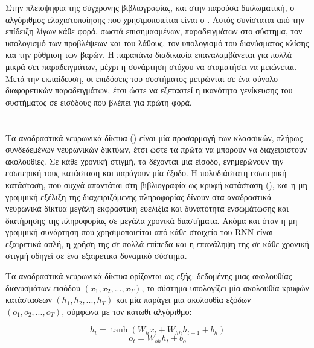 Στην πλειοψηφία της σύγχρονης βιβλιογραφίας, και στην παρούσα διπλωματική, ο αλγόριθμος ελαχιστοποίησης που χρησιμοποιείται είναι ο .
Αυτός συνίσταται από την επίδειξη λίγων κάθε φορά, σωστά επισημασμένων, παραδειγμάτων στο σύστημα, τον υπολογισμό των προβλέψεων και του λάθους, τον υπολογισμό του διανύσματος κλίσης και την ρύθμιση των βαρών.
Η παραπάνω διαδικασία επαναλαμβάνεται για πολλά μικρά σετ παραδειγμάτων, μέχρι η συνάρτηση στόχου να σταματήσει να μειώνεται.
Μετά την εκπαίδευση, οι επιδόσεις του συστήματος μετρώνται σε ένα σύνολο διαφορετικών παραδειγμάτων, έτσι ώστε να εξεταστεί η ικανότητα γενίκευσης του συστήματος σε εισόδους που βλέπει για πρώτη φορά.
 
\section{}

Τα αναδραστικά νευρωνικά δίκτυα () είναι μία προσαρμογή των κλασσικών, πλήρως συνδεδεμένων νευρωνικών δικτύων, έτσι ώστε τα πρώτα να μπορούν να διαχειριστούν ακολουθίες. 
Σε κάθε χρονική στιγμή, τα  δέχονται μια είσοδο, ενημερώνουν την εσωτερική τους κατάσταση και παράγουν μία έξοδο.
Η πολυδιάστατη εσωτερική κατάσταση, που συχνά απαντάται στη βιβλιογραφία ως κρυφή κατάσταση (), και η μη γραμμική εξέλιξη της διαχειριζόμενης πληροφορίας δίνουν στα αναδραστικά νευρωνικά δίκτυα μεγάλη εκφραστική ευελιξία και δυνατότητα ενσωμάτωσης και διατήρησης της πληροφορίας σε μεγάλα χρονικά διαστήματα.
Ακόμα και όταν η μη γραμμική συνάρτηση που χρησιμοποιείται από κάθε στοιχείο του RNN είναι εξαιρετικά απλή, η χρήση της σε πολλά επίπεδα και η επανάληψη της σε κάθε χρονική στιγμή οδηγεί σε ένα εξαιρετικά δυναμικό σύστημα. 

Τα αναδραστικά νευρωνικά δίκτυα ορίζονται ως εξής: δεδομένης μιας ακολουθίας διανυσμάτων εισόδου $(x_1, x_2, ..., x_T)$, το σύστημα υπολογίζει μία ακολουθία κρυφών κατάστασεων $(h_1, h_2, ..., h_T)$ και μία παράγει μια ακολουθία εξόδων $(ο_1, ο_2, ..., ο_T)$, σύμφωνα με τον κάτωθι αλγόριθμο:


\begin{algorithmic}
        \STATE \begin{equation}
        	h_t = \tanh(W_h x_t + W_{hh} h_{t-1} + b_h)\label{eq:h}
        	\end{equation}
        	 \STATE \begin{equation}
					o_t = W_{oh} h_t + b_o
        	\end{equation}
\ENDFOR
\end{algorithmic}

